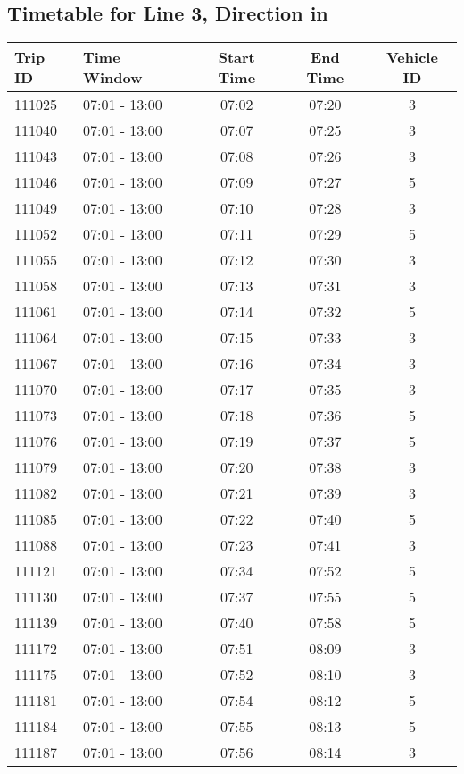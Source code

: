 \documentclass{article}
\begin{document}
\subsection*{Timetable for Line 3, Direction in}
\begin{tabular}{llccc}
\toprule
Trip ID & Time Window & Start Time & End Time & Vehicle ID \\
\midrule
111025 & 07:01 - 13:00 & 07:02 & 07:20 & 3 \\
111040 & 07:01 - 13:00 & 07:07 & 07:25 & 3 \\
111043 & 07:01 - 13:00 & 07:08 & 07:26 & 3 \\
111046 & 07:01 - 13:00 & 07:09 & 07:27 & 5 \\
111049 & 07:01 - 13:00 & 07:10 & 07:28 & 3 \\
111052 & 07:01 - 13:00 & 07:11 & 07:29 & 5 \\
111055 & 07:01 - 13:00 & 07:12 & 07:30 & 3 \\
111058 & 07:01 - 13:00 & 07:13 & 07:31 & 3 \\
111061 & 07:01 - 13:00 & 07:14 & 07:32 & 5 \\
111064 & 07:01 - 13:00 & 07:15 & 07:33 & 3 \\
111067 & 07:01 - 13:00 & 07:16 & 07:34 & 3 \\
111070 & 07:01 - 13:00 & 07:17 & 07:35 & 3 \\
111073 & 07:01 - 13:00 & 07:18 & 07:36 & 5 \\
111076 & 07:01 - 13:00 & 07:19 & 07:37 & 5 \\
111079 & 07:01 - 13:00 & 07:20 & 07:38 & 3 \\
111082 & 07:01 - 13:00 & 07:21 & 07:39 & 3 \\
111085 & 07:01 - 13:00 & 07:22 & 07:40 & 5 \\
111088 & 07:01 - 13:00 & 07:23 & 07:41 & 3 \\
111121 & 07:01 - 13:00 & 07:34 & 07:52 & 5 \\
111130 & 07:01 - 13:00 & 07:37 & 07:55 & 5 \\
111139 & 07:01 - 13:00 & 07:40 & 07:58 & 5 \\
111172 & 07:01 - 13:00 & 07:51 & 08:09 & 3 \\
111175 & 07:01 - 13:00 & 07:52 & 08:10 & 3 \\
111181 & 07:01 - 13:00 & 07:54 & 08:12 & 5 \\
111184 & 07:01 - 13:00 & 07:55 & 08:13 & 5 \\
111187 & 07:01 - 13:00 & 07:56 & 08:14 & 3 \\

\end{tabular}
\end{document}
